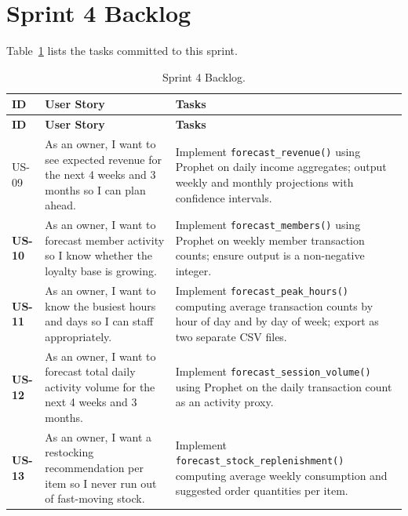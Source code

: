 \section{Sprint 4 Backlog}

Table~\ref{tab:sprint4_backlog} lists the tasks committed to this sprint.

\begin{longtable}{>{\bfseries}p{1.3cm} p{4.0cm} p{7.2cm}}
  \caption{Sprint 4 Backlog.\label{tab:sprint4_backlog}} \\
  \toprule
  \textbf{ID} & \textbf{User Story} & \textbf{Tasks} \\
  \midrule
  \endfirsthead
  \toprule
  \textbf{ID} & \textbf{User Story} & \textbf{Tasks} \\
  \midrule
  \endhead
  \bottomrule
  \endfoot

  US-09 & As an owner, I want to see expected revenue for the next 4 weeks and
          3 months so I can plan ahead.
        & Implement \texttt{forecast\_revenue()} using Prophet on daily income
          aggregates; output weekly and monthly projections with confidence
          intervals. \\[4pt]

  US-10 & As an owner, I want to forecast member activity so I know whether
          the loyalty base is growing.
        & Implement \texttt{forecast\_members()} using Prophet on weekly member
          transaction counts; ensure output is a non-negative integer. \\[4pt]

  US-11 & As an owner, I want to know the busiest hours and days so I can
          staff appropriately.
        & Implement \texttt{forecast\_peak\_hours()} computing average transaction
          counts by hour of day and by day of week; export as two separate CSV
          files. \\[4pt]

  US-12 & As an owner, I want to forecast total daily activity volume for the
          next 4 weeks and 3 months.
        & Implement \texttt{forecast\_session\_volume()} using Prophet on the
          daily transaction count as an activity proxy. \\[4pt]

  US-13 & As an owner, I want a restocking recommendation per item so I never
          run out of fast-moving stock.
        & Implement \texttt{forecast\_stock\_replenishment()} computing average
          weekly consumption and suggested order quantities per item. \\[4pt]


\end{longtable}
